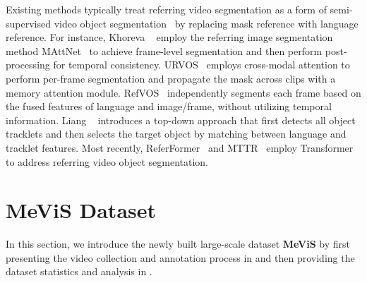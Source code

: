 \documentclass[10pt,twocolumn,letterpaper]{article}
\newcommand{\ourdataset}{MeViS\xspace}
\begin{document}
Existing methods typically treat referring video segmentation as a form of semi-supervised video object segmentation~\cite{davis2017} by replacing mask reference with language reference. For instance, Khoreva \etal~\cite{khoreva2018video} employ the referring image segmentation method MAttNet~\cite{yu2018mattnet} to achieve frame-level segmentation and then perform post-processing for temporal consistency. URVOS~\cite{seo2020urvos} employs cross-modal attention to perform per-frame segmentation and propagate the mask across clips with a memory attention module. RefVOS~\cite{bellver2020refvos} independently segments each frame based on the fused features of language and image/frame, without utilizing temporal information. Liang \etal~\cite{liang2021topdown} introduces a top-down approach that first detects all object tracklets and then selects the target object by matching between language and tracklet features. Most recently, ReferFormer~\cite{wu2022referformer} and MTTR~\cite{MTTR} employ Transformer~\cite{vaswani2017attention} to address referring video object segmentation. \section{\ourdataset Dataset}\label{sec:MeViS_Dataset}
In this section, we introduce the newly built large-scale dataset \textbf{\ourdataset} by first presenting the video collection and annotation process in  and then providing the dataset statistics and analysis in .
\end{document}
